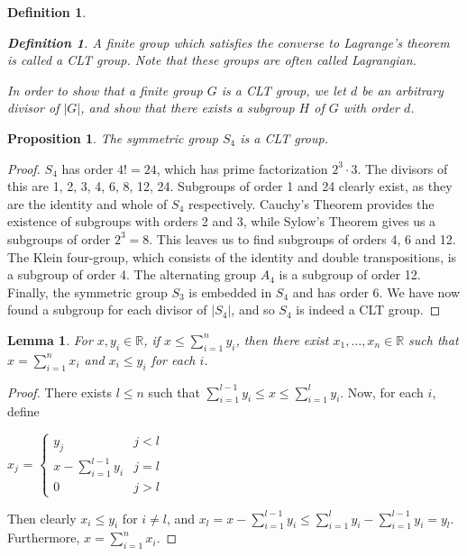 \documentclass[12pt]{report}
\theoremstyle{newthm}
\newtheorem{Proposition}[lem]{Proposition}
\newtheorem{Definition}[lem]{Definition}
\newtheorem{Lemma}[lem]{Lemma}
\begin{document}
\begin{Definition}
\begin{Definition}
A finite group which satisfies the converse to Lagrange's theorem is called a \textit{CLT group}. Note that these groups are often called Lagrangian.
\end{Definition}

In order to show that a finite group $G$ is a CLT group, we let $d$ be an arbitrary divisor of $|G|$, and show that there exists a subgroup $H$ of $G$ with order $d$.

\end{Definition}

\begin{Proposition}\label{S4 CLT}
The symmetric group $S_4$ is a CLT group.
\end{Proposition}

\begin{proof}
$S_4$ has order $4!=24$, which has prime factorization $2^3\cdot 3.$ The divisors of this are 1, 2, 3, 4, 6, 8, 12, 24. Subgroups of order 1 and 24 clearly exist, as they are the identity and whole of $S_4$ respectively. Cauchy's Theorem provides the existence of subgroups with orders 2 and 3, while Sylow's Theorem gives us a subgroups of order $2^3 = 8$. This leaves us to find subgroups of orders 4, 6 and 12.  The Klein four-group, which consists of the identity and double transpositions, is a subgroup of order 4.  The alternating group $A_4$ is a subgroup of order 12.  Finally, the symmetric group $S_3$ is embedded in $S_4$ and has order 6. We have now found a subgroup for each divisor of $|S_4|$, and so $S_4$ is indeed a CLT group.
\end{proof}

\begin{Lemma}\label{sum lemma}
For $x,y_i\in\mathbb{R}$, if $x\leq\sum\limits_{i=1}^n y_i$, then there exist $x_1,\dotsc,x_n\in\mathbb{R}$ such that $x=\sum\limits_{i=1}^n x_i$ and $x_i\leq y_i$ for each $i$.
\end{Lemma}

\begin{proof}
There exists $l\leq n$ such that $\sum\limits_{i=1}^{l-1}y_i\leq x \leq \sum\limits_{i=1}^{l}y_i$. Now, for each $i$, define

\begin{center}
    $x_j$ =   $\left\{
\begin{array}{ll}
y_j & j < l \\
      x - \sum\limits_{i=1}^{l-1}y_i & j = l \\
      0 & j>l
\end{array} 
\right. $
\end{center}
Then clearly $x_i\leq y_i$ for $i\neq l$, and $x_l=x - \sum\limits_{i=1}^{l-1}y_i \leq
\sum\limits_{i=1}^{l}y_i- \sum\limits_{i=1}^{l-1}y_i = y_l$. Furthermore, $x=\sum\limits_{i=1}^n x_i$.
\end{proof}
\end{document}
